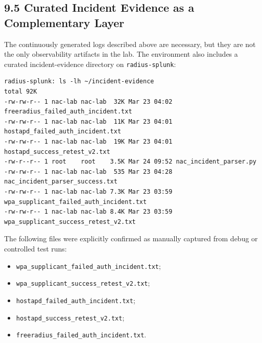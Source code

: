 \documentclass[11pt]{article}
\begin{document}

\subsection{9.5 Curated Incident Evidence as a Complementary Layer}
\label{sec:curated-incident-evidence-as-a-complementary-layer}

The continuously generated logs described above are necessary, but they are not the only observability artifacts in the lab. The environment also includes a curated incident-evidence directory on \texttt{radius-splunk}:

\begin{verbatim}
radius-splunk: ls -lh ~/incident-evidence
total 92K
-rw-rw-r-- 1 nac-lab nac-lab  32K Mar 23 04:02 freeradius_failed_auth_incident.txt
-rw-rw-r-- 1 nac-lab nac-lab  11K Mar 23 04:01 hostapd_failed_auth_incident.txt
-rw-rw-r-- 1 nac-lab nac-lab  19K Mar 23 04:01 hostapd_success_retest_v2.txt
-rw-r--r-- 1 root    root    3.5K Mar 24 09:52 nac_incident_parser.py
-rw-rw-r-- 1 nac-lab nac-lab  535 Mar 23 04:28 nac_incident_parser_success.txt
-rw-rw-r-- 1 nac-lab nac-lab 7.3K Mar 23 03:59 wpa_supplicant_failed_auth_incident.txt
-rw-rw-r-- 1 nac-lab nac-lab 8.4K Mar 23 03:59 wpa_supplicant_success_retest_v2.txt
\end{verbatim}

The following files were explicitly confirmed as manually captured from debug or controlled test runs:

\begin{itemize}
    \item \texttt{wpa\_supplicant\_failed\_auth\_incident.txt};
    \item \texttt{wpa\_supplicant\_success\_retest\_v2.txt};
    \item \texttt{hostapd\_failed\_auth\_incident.txt};
    \item \texttt{hostapd\_success\_retest\_v2.txt};
    \item \texttt{freeradius\_failed\_auth\_incident.txt}.
\end{itemize}
\end{document}
